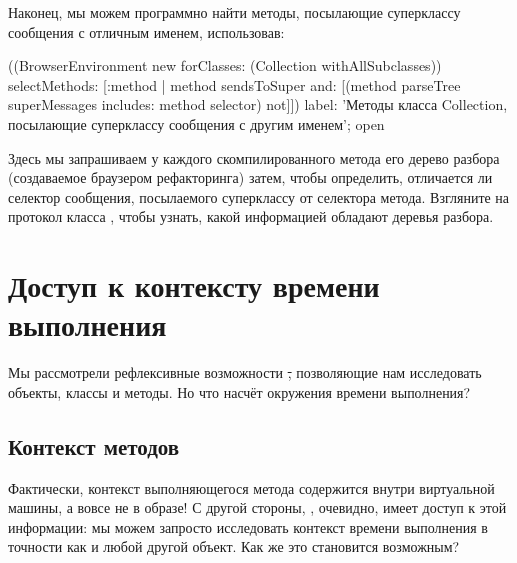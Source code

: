 \documentclass[a4paper,10pt,twoside]{book}
\begin{document}
Наконец, мы можем программно найти методы, посылающие суперклассу сообщения с отличным именем, использовав:
\begin{code}{}
((BrowserEnvironment new forClasses: (Collection withAllSubclasses))
	selectMethods: [:method | 
		method sendsToSuper
		and: [(method parseTree superMessages includes: method selector) not]])
	label: 'Методы класса Collection, посылающие суперклассу сообщения с другим именем';
	open
\end{code}
Здесь мы запрашиваем у каждого скомпилированного метода его дерево разбора (создаваемое браузером рефакторинга) затем, чтобы определить, отличается ли селектор сообщения, посылаемого суперклассу от селектора метода.
Взгляните на протокол  класса , чтобы узнать, какой информацией обладают деревья разбора.

\section{Доступ к контексту времени выполнения}

Мы рассмотрели рефлексивные возможности \st, позволяющие нам исследовать объекты, классы и методы. Но что насчёт окружения времени выполнения?

\subsection{Контекст методов}

Фактически, контекст выполняющегося метода содержится внутри виртуальной машины, а вовсе не в образе!
С другой стороны, , очевидно, имеет доступ к этой информации: мы можем запросто исследовать контекст времени выполнения в точности как и любой другой объект.
Как же это становится возможным?
\end{document}
